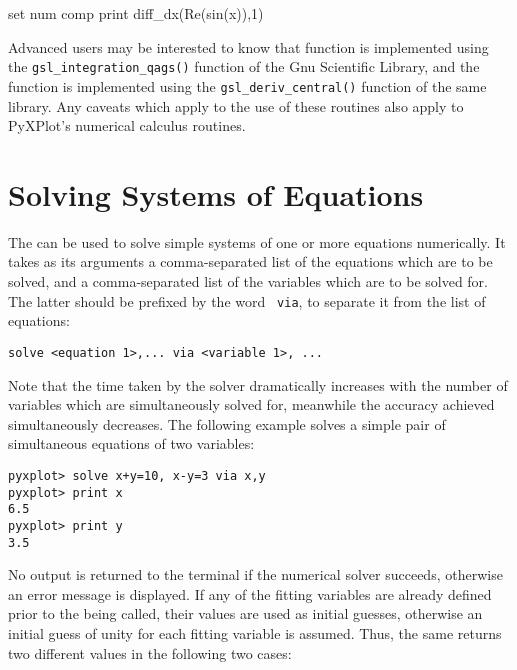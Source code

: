 \begin{dontdo}
set num comp\newline
print diff\_dx(Re(sin(x)),1)
\end{dontdo}

Advanced users may be interested to know that  function is
implemented using the {\tt gsl\_integration\_qags()} function of the Gnu
Scientific Library, and the  function is
implemented using the {\tt gsl\_deriv\_central()} function of the same library.
Any caveats which apply to the use of these routines also apply to PyXPlot's
numerical calculus routines.


\section{Solving Systems of Equations}

The  can be used to solve simple systems of one or more
equations numerically. It takes as its arguments a comma-separated list of the
equations which are to be solved, and a comma-separated list of the variables
which are to be solved for. The latter should be prefixed by the word {\tt
via}, to separate it from the list of equations:

\begin{verbatim}
solve <equation 1>,... via <variable 1>, ...
\end{verbatim}

Note that the time taken by the solver dramatically increases with the number
of variables which are simultaneously solved for, meanwhile the accuracy
achieved simultaneously decreases. The following example solves a simple pair
of simultaneous equations of two variables:

\begin{verbatim}
pyxplot> solve x+y=10, x-y=3 via x,y
pyxplot> print x
6.5
pyxplot> print y
3.5
\end{verbatim}

\noindent No output is returned to the terminal if the numerical solver
succeeds, otherwise an error message is displayed. If any of the fitting
variables are already defined prior to the  being called, their
values are used as initial guesses, otherwise an initial guess of unity for
each fitting variable is assumed. Thus, the same  returns two
different values in the following two cases:

